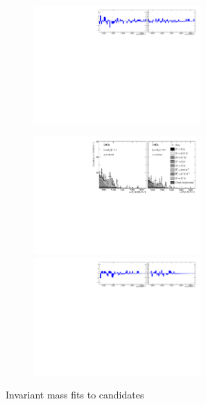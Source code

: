 \begin{figure}[!h]
\begin{subfigure}[t]{1.0\textwidth}
        \includegraphics[width=0.7\textwidth]{figs/Appendix_FitCategories/residuals_DsPhi_Ds2KKPi_both_summed_splitHel_splitKKPi_s21_s21r1_s24_s26.pdf}
    \end{subfigure}
    \begin{subfigure}[t]{1.0\textwidth}
        \centering
        \includegraphics[width=0.7\textwidth]{figs/Appendix_FitCategories/canvas_DsPhiSide_Ds2KKPi_both_summed_splitHel_splitKKPi_s21_s21r1_s24_s26.pdf}\\
        \includegraphics[width=0.7\textwidth]{figs/Appendix_FitCategories/residuals_DsPhiSide_Ds2KKPi_both_summed_splitHel_splitKKPi_s21_s21r1_s24_s26.pdf}
    \end{subfigure}
    \caption{Invariant mass fits to \decay{\Bp}{\Dsp\phiz} candidates}
\end{figure}

